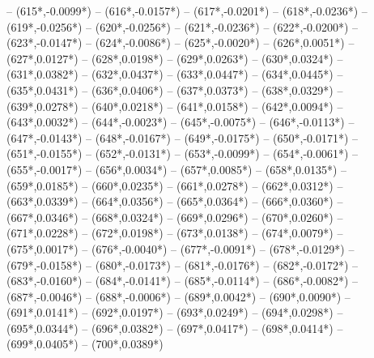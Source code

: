 {		-- ({615*\dx},{-0.0099*\dy})
		-- ({616*\dx},{-0.0157*\dy})
		-- ({617*\dx},{-0.0201*\dy})
		-- ({618*\dx},{-0.0236*\dy})
		-- ({619*\dx},{-0.0256*\dy})
		-- ({620*\dx},{-0.0256*\dy})
		-- ({621*\dx},{-0.0236*\dy})
		-- ({622*\dx},{-0.0200*\dy})
		-- ({623*\dx},{-0.0147*\dy})
		-- ({624*\dx},{-0.0086*\dy})
		-- ({625*\dx},{-0.0020*\dy})
		-- ({626*\dx},{0.0051*\dy})
		-- ({627*\dx},{0.0127*\dy})
		-- ({628*\dx},{0.0198*\dy})
		-- ({629*\dx},{0.0263*\dy})
		-- ({630*\dx},{0.0324*\dy})
		-- ({631*\dx},{0.0382*\dy})
		-- ({632*\dx},{0.0437*\dy})
		-- ({633*\dx},{0.0447*\dy})
		-- ({634*\dx},{0.0445*\dy})
		-- ({635*\dx},{0.0431*\dy})
		-- ({636*\dx},{0.0406*\dy})
		-- ({637*\dx},{0.0373*\dy})
		-- ({638*\dx},{0.0329*\dy})
		-- ({639*\dx},{0.0278*\dy})
		-- ({640*\dx},{0.0218*\dy})
		-- ({641*\dx},{0.0158*\dy})
		-- ({642*\dx},{0.0094*\dy})
		-- ({643*\dx},{0.0032*\dy})
		-- ({644*\dx},{-0.0023*\dy})
		-- ({645*\dx},{-0.0075*\dy})
		-- ({646*\dx},{-0.0113*\dy})
		-- ({647*\dx},{-0.0143*\dy})
		-- ({648*\dx},{-0.0167*\dy})
		-- ({649*\dx},{-0.0175*\dy})
		-- ({650*\dx},{-0.0171*\dy})
		-- ({651*\dx},{-0.0155*\dy})
		-- ({652*\dx},{-0.0131*\dy})
		-- ({653*\dx},{-0.0099*\dy})
		-- ({654*\dx},{-0.0061*\dy})
		-- ({655*\dx},{-0.0017*\dy})
		-- ({656*\dx},{0.0034*\dy})
		-- ({657*\dx},{0.0085*\dy})
		-- ({658*\dx},{0.0135*\dy})
		-- ({659*\dx},{0.0185*\dy})
		-- ({660*\dx},{0.0235*\dy})
		-- ({661*\dx},{0.0278*\dy})
		-- ({662*\dx},{0.0312*\dy})
		-- ({663*\dx},{0.0339*\dy})
		-- ({664*\dx},{0.0356*\dy})
		-- ({665*\dx},{0.0364*\dy})
		-- ({666*\dx},{0.0360*\dy})
		-- ({667*\dx},{0.0346*\dy})
		-- ({668*\dx},{0.0324*\dy})
		-- ({669*\dx},{0.0296*\dy})
		-- ({670*\dx},{0.0260*\dy})
		-- ({671*\dx},{0.0228*\dy})
		-- ({672*\dx},{0.0198*\dy})
		-- ({673*\dx},{0.0138*\dy})
		-- ({674*\dx},{0.0079*\dy})
		-- ({675*\dx},{0.0017*\dy})
		-- ({676*\dx},{-0.0040*\dy})
		-- ({677*\dx},{-0.0091*\dy})
		-- ({678*\dx},{-0.0129*\dy})
		-- ({679*\dx},{-0.0158*\dy})
		-- ({680*\dx},{-0.0173*\dy})
		-- ({681*\dx},{-0.0176*\dy})
		-- ({682*\dx},{-0.0172*\dy})
		-- ({683*\dx},{-0.0160*\dy})
		-- ({684*\dx},{-0.0141*\dy})
		-- ({685*\dx},{-0.0114*\dy})
		-- ({686*\dx},{-0.0082*\dy})
		-- ({687*\dx},{-0.0046*\dy})
		-- ({688*\dx},{-0.0006*\dy})
		-- ({689*\dx},{0.0042*\dy})
		-- ({690*\dx},{0.0090*\dy})
		-- ({691*\dx},{0.0141*\dy})
		-- ({692*\dx},{0.0197*\dy})
		-- ({693*\dx},{0.0249*\dy})
		-- ({694*\dx},{0.0298*\dy})
		-- ({695*\dx},{0.0344*\dy})
		-- ({696*\dx},{0.0382*\dy})
		-- ({697*\dx},{0.0417*\dy})
		-- ({698*\dx},{0.0414*\dy})
		-- ({699*\dx},{0.0405*\dy})
		-- ({700*\dx},{0.0389*\dy})
}

